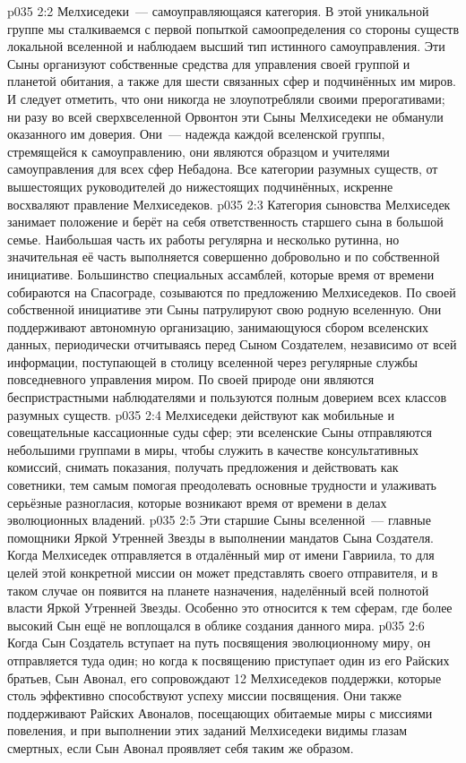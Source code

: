 \vs p035 2:2 Мелхиседеки~--- самоуправляющаяся категория. В этой уникальной группе мы сталкиваемся с первой попыткой самоопределения со стороны существ локальной вселенной и наблюдаем высший тип истинного самоуправления. Эти Сыны организуют собственные средства для управления своей группой и планетой обитания, а также для шести связанных сфер и подчинённых им миров. И следует отметить, что они никогда не злоупотребляли своими прерогативами; ни разу во всей сверхвселенной Орвонтон эти Сыны Мелхиседеки не обманули оказанного им доверия. Они~--- надежда каждой вселенской группы, стремящейся к самоуправлению, они являются образцом и учителями самоуправления для всех сфер Небадона. Все категории разумных существ, от вышестоящих руководителей до нижестоящих подчинённых, искренне восхваляют правление Мелхиседеков.
\vs p035 2:3 \pc Категория сыновства Мелхиседек занимает положение и берёт на себя ответственность старшего сына в большой семье. Наибольшая часть их работы регулярна и несколько рутинна, но значительная её часть выполняется совершенно добровольно и по собственной инициативе. Большинство специальных ассамблей, которые время от времени собираются на Спасограде, созываются по предложению Мелхиседеков. По своей собственной инициативе эти Сыны патрулируют свою родную вселенную. Они поддерживают автономную организацию, занимающуюся сбором вселенских данных, периодически отчитываясь перед Сыном Создателем, независимо от всей информации, поступающей в столицу вселенной через регулярные службы повседневного управления миром. По своей природе они являются беспристрастными наблюдателями и пользуются полным доверием всех классов разумных существ.
\vs p035 2:4 Мелхиседеки действуют как мобильные и совещательные кассационные суды сфер; эти вселенские Сыны отправляются небольшими группами в миры, чтобы служить в качестве консультативных комиссий, снимать показания, получать предложения и действовать как советники, тем самым помогая преодолевать основные трудности и улаживать серьёзные разногласия, которые возникают время от времени в делах эволюционных владений.
\vs p035 2:5 Эти старшие Сыны вселенной~--- главные помощники Яркой Утренней Звезды в выполнении мандатов Сына Создателя. Когда Мелхиседек отправляется в отдалённый мир от имени Гавриила, то для целей этой конкретной миссии он может представлять своего отправителя, и в таком случае он появится на планете назначения, наделённый всей полнотой власти Яркой Утренней Звезды. Особенно это относится к тем сферам, где более высокий Сын ещё не воплощался в облике создания данного мира.
\vs p035 2:6 Когда Сын Создатель вступает на путь посвящения эволюционному миру, он отправляется туда один; но когда к посвящению приступает один из его Райских братьев, Сын Авонал, его сопровождают 12 Мелхиседеков поддержки, которые столь эффективно способствуют успеху миссии посвящения. Они также поддерживают Райских Авоналов, посещающих обитаемые миры с миссиями повеления, и при выполнении этих заданий Мелхиседеки видимы глазам смертных, если Сын Авонал проявляет себя таким же образом.

